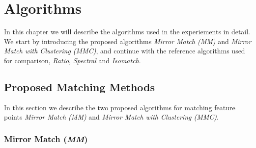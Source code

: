\chapter{Algorithms}
\label{C:Algorithms}

In this chapter we will describe the algorithms used in the experiements
in detail. We start by introducing the proposed algorithms \emph{Mirror 
Match (MM)} and \emph{Mirror Match with Clustering (MMC)}, and continue 
with the reference algorithms used for comparison, \emph{Ratio}, 
\emph{Spectral} and \emph{Isomatch}.

\section{Proposed Matching Methods}
\label{S:MatchingMethods}
In this section we describe the two proposed algorithms for matching 
feature points \emph{Mirror Match
(MM)} and \emph{Mirror Match with Clustering (MMC)}. 

\subsection{Mirror Match (\emph{MM})}

